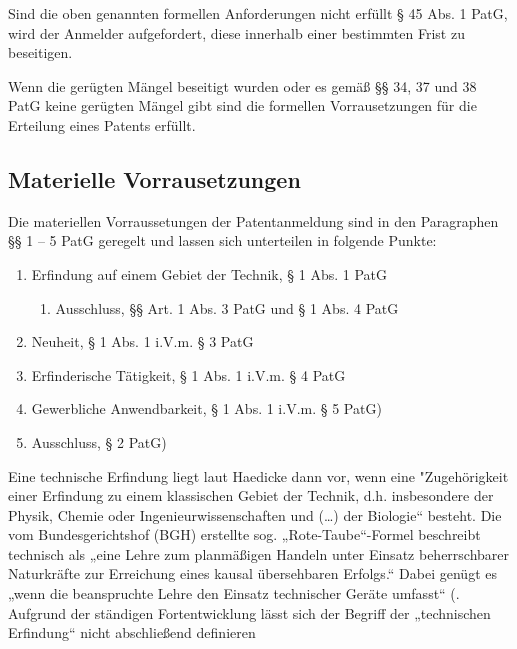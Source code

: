Sind die oben genannten formellen Anforderungen nicht erfüllt § 45 Abs. 1 PatG, wird der Anmelder aufgefordert, diese innerhalb einer bestimmten Frist zu beseitigen.

Wenn die gerügten Mängel beseitigt wurden oder es gemäß §§ 34, 37 und 38 PatG keine gerügten Mängel gibt sind die formellen Vorrausetzungen für die Erteilung eines Patents erfüllt.

\subsection{Materielle Vorrausetzungen}

Die materiellen Vorraussetungen der Patentanmeldung sind in den Paragraphen §§ 1 – 5 PatG geregelt und lassen sich unterteilen in folgende Punkte:

\begin{enumerate}
    \item Erfindung auf einem Gebiet der Technik, § 1 Abs. 1 PatG
    \begin{enumerate}
    \vspace{-0.05in}
    \item Ausschluss, §§ Art. 1 Abs. 3 PatG und § 1 Abs. 4 PatG
    \end{enumerate}
    \vspace{-0.11in} 
    \item Neuheit, § 1 Abs. 1 i.V.m. § 3 PatG
    \vspace{-0.11in} 
    \item Erfinderische Tätigkeit, § 1 Abs. 1 i.V.m. § 4 PatG
    \vspace{-0.11in} 
    \item Gewerbliche Anwendbarkeit, § 1 Abs. 1 i.V.m. § 5 PatG)
    \vspace{-0.11in} 
    \item Ausschluss, § 2 PatG)
\end{enumerate}

Eine technische Erfindung liegt laut Haedicke dann vor, wenn eine "Zugehörigkeit einer Erfindung zu einem klassischen Gebiet der Technik, d.h. insbesondere der Physik, Chemie oder Ingenieurwissenschaften
und (…) der Biologie“ besteht. \cite{(Haedicke, Patentrecht, 5. Auflage 2020, Kap. 6, Rn. 15)} Die vom Bundesgerichtshof (BGH) erstellte sog. „Rote-Taube“-Formel beschreibt technisch als  „eine Lehre zum planmäßigen Handeln unter Einsatz beherrschbarer Naturkräfte zur Erreichung eines kausal übersehbaren Erfolgs.“\cite{(Bundesgerichtshof (BGH), Urteil vom 27. März 1969, Az.: X ZB 15/67)}  Dabei genügt es „wenn die beanspruchte Lehre den Einsatz technischer Geräte umfasst“
(\cite{Bundesgerichtshof, Beschluss vom 30. Juni 2015, Az.: X ZB 1/15, III, 1. A), mit Verweis auf: BGH, Urteil vom 24.Februar 2011 -XZR121/09, GRUR 2011, 610 Rn.16)}. Aufgrund der ständigen
Fortentwicklung lässt sich der Begriff der „technischen Erfindung“ nicht abschließend definieren \cite{Haedicke, Patentrecht, 5. Auflage 2020, Kap. 6, Rn. 11).}
\\

